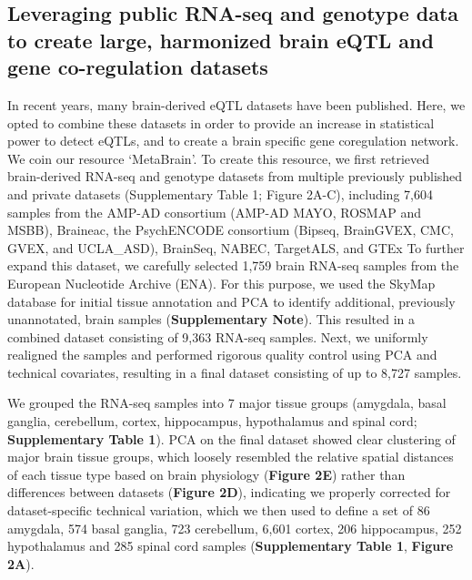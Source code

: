 \subsection{Leveraging public RNA-seq and genotype data to create large, harmonized brain eQTL and gene co-regulation datasets}
In recent years, many brain-derived eQTL datasets have been published. Here, we opted to combine these datasets in order to provide an increase in statistical power to detect eQTLs, and to create a brain specific gene coregulation network. We coin our resource ‘MetaBrain'. To create this resource, we first retrieved brain-derived RNA-seq and genotype datasets from multiple previously published and private datasets (Supplementary Table 1; Figure 2A-C), including 7,604 samples from the AMP-AD consortium\cite{hodesAcceleratingMedicinesPartnership2016a} (AMP-AD MAYO\cite{hodesAcceleratingMedicinesPartnership2016a}, ROSMAP\cite{hodesAcceleratingMedicinesPartnership2016a} and MSBB\cite{hodesAcceleratingMedicinesPartnership2016a}), Braineac\cite{ramasamyGeneticVariabilityRegulation2014}, the PsychENCODE consortium\cite{consortium*RevealingBrainMolecular2018} (Bipseq\cite{wangComprehensiveFunctionalGenomic2018a}, BrainGVEX\cite{wangComprehensiveFunctionalGenomic2018a}, CMC\cite{fromerGeneExpressionElucidates2016}, GVEX, and UCLA\_ASD\cite{wangComprehensiveFunctionalGenomic2018a}), BrainSeq\cite{brainseq2015}, NABEC\cite{gibbsAbundantQuantitativeTrait2010}, TargetALS\cite{prudencioDistinctBrainTranscriptome2015}, and GTEx\cite{donovanCellularDeconvolutionGTEx2020} To further expand this dataset, we carefully selected 1,759 brain RNA-seq samples from the European Nucleotide Archive (ENA)\cite{leinonenEuropeanNucleotideArchive2011}. For this purpose, we used the SkyMap\cite{tsuiExtractingAllelicRead2018} database for initial tissue annotation and PCA to identify additional, previously unannotated, brain samples (\textbf{Supplementary Note}). This resulted in a combined dataset consisting of 9,363 RNA-seq samples. Next, we uniformly realigned the samples and performed rigorous quality control using PCA and technical covariates, resulting in a final dataset consisting of up to 8,727 samples.  

We grouped the RNA-seq samples into 7 major tissue groups (amygdala, basal ganglia, cerebellum, cortex, hippocampus, hypothalamus and spinal cord; \textbf{Supplementary Table 1}). PCA on the final dataset showed clear clustering of major brain tissue groups, which loosely resembled the relative spatial distances of each tissue type based on brain physiology (\textbf{Figure 2E}) rather than differences between datasets (\textbf{Figure 2D}), indicating we properly corrected for dataset-specific technical variation, which we then used to define a set of 86 amygdala, 574 basal ganglia, 723 cerebellum, 6,601 cortex, 206 hippocampus, 252 hypothalamus and 285 spinal cord samples (\textbf{Supplementary Table 1}, \textbf{Figure 2A}). 

